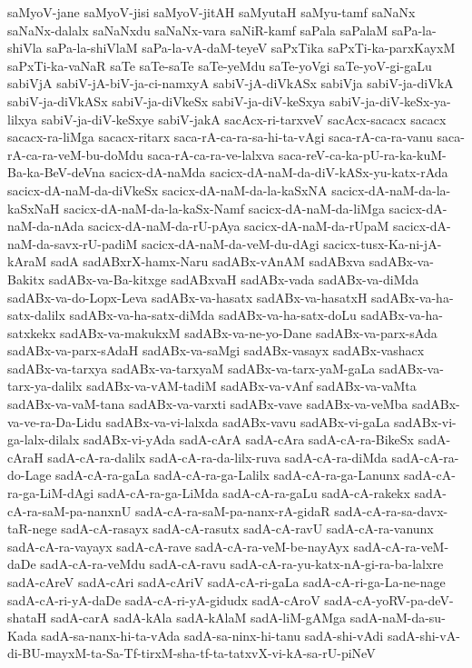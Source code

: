 {saMyoV-jane
saMyoV-jisi
saMyoV-jitAH
saMyutaH
saMyu-tamf
saNaNx
saNaNx-dalalx
saNaNxdu
saNaNx-vara
saNiR-kamf
saPala
saPalaM
saPa-la-shiVla
saPa-la-shiVlaM
saPa-la-vA-daM-teyeV
saPxTika
saPxTi-ka-parxKayxM
saPxTi-ka-vaNaR
saTe
saTe-saTe
saTe-yeMdu
saTe-yoVgi
saTe-yoV-gi-gaLu
sabiVjA
sabiV-jA-biV-ja-ci-namxyA
sabiV-jA-diVkASx
sabiVja
sabiV-ja-diVkA
sabiV-ja-diVkASx
sabiV-ja-diVkeSx
sabiV-ja-diV-keSxya
sabiV-ja-diV-keSx-ya-lilxya
sabiV-ja-diV-keSxye
sabiV-jakA
sacAcx-ri-tarxveV
sacAcx-sacacx
sacacx
sacacx-ra-liMga
sacacx-ritarx
saca-rA-ca-ra-sa-hi-ta-vAgi
saca-rA-ca-ra-vanu
saca-rA-ca-ra-veM-bu-doMdu
saca-rA-ca-ra-ve-lalxva
saca-reV-ca-ka-pU-ra-ka-kuM-Ba-ka-BeV-deVna
sacicx-dA-naMda
sacicx-dA-naM-da-diV-kASx-yu-katx-rAda
sacicx-dA-naM-da-diVkeSx
sacicx-dA-naM-da-la-kaSxNA
sacicx-dA-naM-da-la-kaSxNaH
sacicx-dA-naM-da-la-kaSx-Namf
sacicx-dA-naM-da-liMga
sacicx-dA-naM-da-nAda
sacicx-dA-naM-da-rU-pAya
sacicx-dA-naM-da-rUpaM
sacicx-dA-naM-da-savx-rU-padiM
sacicx-dA-naM-da-veM-du-dAgi
sacicx-tusx-Ka-ni-jA-kAraM
sadA
sadABxrX-hamx-Naru
sadABx-vAnAM
sadABxva
sadABx-va-Bakitx
sadABx-va-Ba-kitxge
sadABxvaH
sadABx-vada
sadABx-va-diMda
sadABx-va-do-Lopx-Leva
sadABx-va-hasatx
sadABx-va-hasatxH
sadABx-va-ha-satx-dalilx
sadABx-va-ha-satx-diMda
sadABx-va-ha-satx-doLu
sadABx-va-ha-satxkekx
sadABx-va-makukxM
sadABx-va-ne-yo-Dane
sadABx-va-parx-sAda
sadABx-va-parx-sAdaH
sadABx-va-saMgi
sadABx-vasayx
sadABx-vashacx
sadABx-va-tarxya
sadABx-va-tarxyaM
sadABx-va-tarx-yaM-gaLa
sadABx-va-tarx-ya-dalilx
sadABx-va-vAM-tadiM
sadABx-va-vAnf
sadABx-va-vaMta
sadABx-va-vaM-tana
sadABx-va-varxti
sadABx-vave
sadABx-va-veMba
sadABx-va-ve-ra-Da-Lidu
sadABx-va-vi-lalxda
sadABx-vavu
sadABx-vi-gaLa
sadABx-vi-ga-lalx-dilalx
sadABx-vi-yAda
sadA-cArA
sadA-cAra
sadA-cA-ra-BikeSx
sadA-cAraH
sadA-cA-ra-dalilx
sadA-cA-ra-da-lilx-ruva
sadA-cA-ra-diMda
sadA-cA-ra-do-Lage
sadA-cA-ra-gaLa
sadA-cA-ra-ga-Lalilx
sadA-cA-ra-ga-Lanunx
sadA-cA-ra-ga-LiM-dAgi
sadA-cA-ra-ga-LiMda
sadA-cA-ra-gaLu
sadA-cA-rakekx
sadA-cA-ra-saM-pa-nanxnU
sadA-cA-ra-saM-pa-nanx-rA-gidaR
sadA-cA-ra-sa-davx-taR-nege
sadA-cA-rasayx
sadA-cA-rasutx
sadA-cA-ravU
sadA-cA-ra-vanunx
sadA-cA-ra-vayayx
sadA-cA-rave
sadA-cA-ra-veM-be-nayAyx
sadA-cA-ra-veM-daDe
sadA-cA-ra-veMdu
sadA-cA-ravu
sadA-cA-ra-yu-katx-nA-gi-ra-ba-lalxre
sadA-cAreV
sadA-cAri
sadA-cAriV
sadA-cA-ri-gaLa
sadA-cA-ri-ga-La-ne-nage
sadA-cA-ri-yA-daDe
sadA-cA-ri-yA-gidudx
sadA-cAroV
sadA-cA-yoRV-pa-deV-shataH
sadA-carA
sadA-kAla
sadA-kAlaM
sadA-liM-gAMga
sadA-naM-da-su-Kada
sadA-sa-nanx-hi-ta-vAda
sadA-sa-ninx-hi-tanu
sadA-shi-vAdi
sadA-shi-vA-di-BU-mayxM-ta-Sa-Tf-tirxM-sha-tf-ta-tatxvX-vi-kA-sa-rU-piNeV
}
